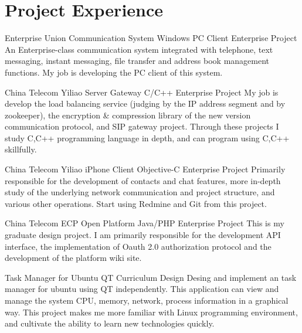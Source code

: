 \documentclass[11pt,a4paper]{moderncv}
\begin{document}
\section{Project Experience}
{Enterprise Union Communication System}
{Windows PC Client}
{Enterprise Project}{}
{
An Enterprise-class communication system integrated with telephone, text messaging, instant messaging,
file transfer and address book management functions. My job is developing the PC client of this system.
}

\vspace*{0.2\baselineskip}
{China Telecom Yiliao Server Gateway}
{C/C++}
{Enterprise Project}{}
{
My job is develop the load balancing service (judging by the IP address segment and by zookeeper), 
the encryption \& compression library of the new version communication protocol, and SIP gateway project.
Through these projects I study  C,C++ programming language in depth, and can program using C,C++ skillfully.
}

\vspace*{0.2\baselineskip}
{China Telecom Yiliao iPhone Client}
{Objective-C}
{Enterprise Project}{}
{
Primarily responsible for the development of contacts and chat features, more in-depth study of the underlying network communication and project structure,
and various other operations. Start using Redmine and Git from this project.
}

\vspace*{0.2\baselineskip}
{China Telecom ECP Open Platform}
{Java/PHP}
{Enterprise Project}{}
{
This is my graduate design project. I am primarily responsible for the development API interface, the implementation of Oauth 2.0 authorization protocol
and the development of the platform wiki site.
}

\vspace*{0.2\baselineskip}
{Task Manager for Ubuntu}
{QT}
{Curriculum Design}{}
{
Desing and implement an task manager for ubuntu using QT independently. This application can view and manage
the system CPU, memory, network, process information  in a graphical way. This project makes me more familiar
with Linux programming environment, and cultivate the ability to learn new technologies quickly.
}
\end{document}
